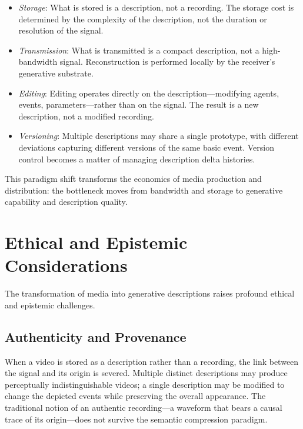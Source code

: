 \documentclass[12pt,a4paper]{article}
\theoremstyle{definition}
\theoremstyle{remark}
\begin{document}
\begin{itemize}
\item \emph{Storage}: What is stored is a description, not a recording. The storage cost is determined by the complexity of the description, not the duration or resolution of the signal.

\item \emph{Transmission}: What is transmitted is a compact description, not a high-bandwidth signal. Reconstruction is performed locally by the receiver's generative substrate.

\item \emph{Editing}: Editing operates directly on the description---modifying agents, events, parameters---rather than on the signal. The result is a new description, not a modified recording.

\item \emph{Versioning}: Multiple descriptions may share a single prototype, with different deviations capturing different versions of the same basic event. Version control becomes a matter of managing description delta histories.
\end{itemize}

This paradigm shift transforms the economics of media production and distribution: the bottleneck moves from bandwidth and storage to generative capability and description quality.

\section{Ethical and Epistemic Considerations}
\label{sec:ethics}

The transformation of media into generative descriptions raises profound ethical and epistemic challenges.

\subsection{Authenticity and Provenance}

When a video is stored as a description rather than a recording, the link between the signal and its origin is severed. Multiple distinct descriptions may produce perceptually indistinguishable videos; a single description may be modified to change the depicted events while preserving the overall appearance. The traditional notion of an authentic recording---a waveform that bears a causal trace of its origin---does not survive the semantic compression paradigm.
\end{document}

